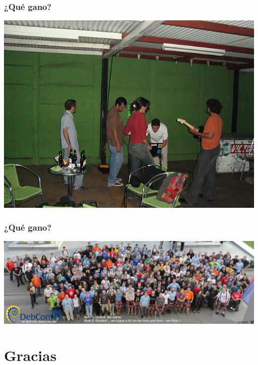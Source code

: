\documentclass{beamer}
\begin{document}
\begin{frame}
\frametitle{¿Qu\'e gano?}
	\begin{center}
                 \includegraphics[scale=0.30]{../img/dsc04738.jpg}
	\end{center}
\end{frame}


\begin{frame} 
\frametitle{¿Qu\'e gano?}
                 \includegraphics[scale=0.30]{../img/dc11photogroup.jpg}
\end{frame}


\section{Gracias}
\end{document}
